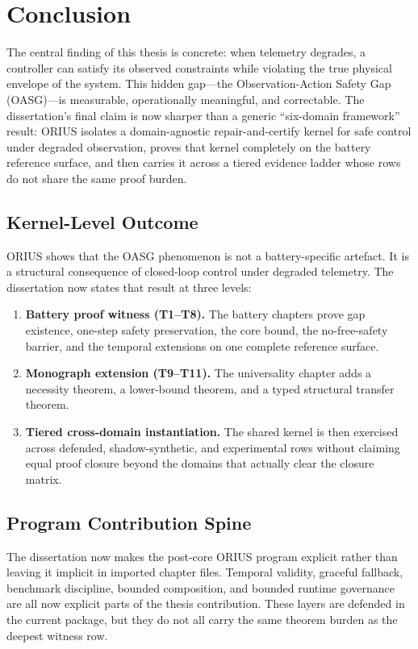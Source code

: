 \chapter{Conclusion}
\label{ch:conclusion}

The central finding of this thesis is concrete: when telemetry degrades,
a controller can satisfy its observed constraints while violating the true
physical envelope of the system.  This hidden gap---the
Observation-Action Safety Gap (OASG)---is measurable, operationally
meaningful, and correctable.  The dissertation's final claim is now
sharper than a generic ``six-domain framework'' result: ORIUS isolates a
domain-agnostic repair-and-certify kernel for safe control under degraded
observation, proves that kernel completely on the battery reference surface,
and then carries it across a tiered evidence ladder whose rows do not share
the same proof burden.

\section{Kernel-Level Outcome}

ORIUS shows that the OASG phenomenon is not a battery-specific artefact.
It is a structural consequence of closed-loop control under degraded
telemetry.  The dissertation now states that result at three levels:
\begin{enumerate}
  \item \textbf{Battery proof witness (T1--T8).} The battery chapters prove
    gap existence, one-step safety preservation, the core bound, the
    no-free-safety barrier, and the temporal extensions on one complete
    reference surface.
  \item \textbf{Monograph extension (T9--T11).} The universality chapter adds
    a necessity theorem, a lower-bound theorem, and a typed structural
    transfer theorem.
  \item \textbf{Tiered cross-domain instantiation.} The shared kernel is then
    exercised across defended, shadow-synthetic, and experimental rows
    without claiming equal proof closure beyond the domains that actually
    clear the closure matrix.
\end{enumerate}

\section{Program Contribution Spine}

The dissertation now makes the post-core ORIUS program explicit rather than
leaving it implicit in imported chapter files. Temporal validity, graceful
fallback, benchmark discipline, bounded composition, and bounded runtime
governance are all now explicit parts of the thesis contribution. These
layers are defended in the current package, but they do not all carry the
same theorem burden as the deepest witness row.

